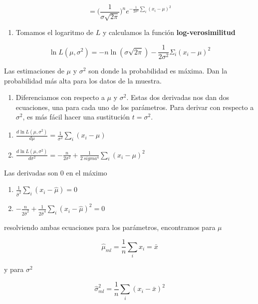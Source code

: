 \documentclass[
]{book}
\providecommand{\tightlist}{%
  \setlength{\itemsep}{0pt}\setlength{\parskip}{0pt}}
\begin{document}
\[=\big( \frac{1}{\sigma \sqrt{2 \pi}}\big)^ne^{-\frac{1}{2\sigma^2} \sum_i(x_i-\mu) ^2}\]

\begin{enumerate}
\def\labelenumi{\arabic{enumi}.}
\setcounter{enumi}{1}
\tightlist
\item
  Tomamos el logaritmo de \(L\) y calculamos la función \textbf{log-verosimilitud}
\end{enumerate}

\[\ln L(\mu, \sigma^2)=-n \ln(\sigma \sqrt{2 \pi})-\frac{1}{2\sigma^2} \Sigma_i(x_i-\mu )^2\]

Las estimaciones de \(\mu\) y \(\sigma^2\) son donde la probabilidad es máxima. Dan la probabilidad más alta para los datos de la muestra.

\begin{enumerate}
\def\labelenumi{\arabic{enumi}.}
\setcounter{enumi}{2}
\tightlist
\item
  Diferenciamos con respecto a \(\mu\) y \(\sigma^2\). Estas dos derivadas nos dan dos ecuaciones, una para cada uno de los parámetros. Para derivar con respecto a \(\sigma^2\), es más fácil hacer una sustitución \(t=\sigma^2\).
\end{enumerate}

\begin{enumerate}
\def\labelenumi{\alph{enumi})}
\item
  \(\frac{d \ln L(\mu, \sigma^2)}{d\mu}=\frac{1}{\sigma^2} \sum_i(x_i-\mu)\)
\item
  \(\frac{d \ln L(\mu, \sigma^2)}{d\sigma^2}=-\frac{n}{2 \sigma^2}+\frac{1}{2\ sigma^4} \sum_i(x_i-\mu)^2\)
\end{enumerate}

Las derivadas son \(0\) en el máximo

\begin{enumerate}
\def\labelenumi{\alph{enumi})}
\tightlist
\item
  \(\frac{1}{\hat{\sigma}^2} \sum_i(x_i-\hat{\mu})=0\)
\item
  \(-\frac{n}{2 \hat{\sigma}^2}+\frac{1}{2\hat{\sigma}^4} \sum_i(x_i-\hat{\mu})^ 2=0\)
\end{enumerate}

resolviendo ambas ecuaciones para los parámetros, encontramos para \(\mu\)

\[\hat{\mu}_{ml}=\frac{1}{n}\sum_i x_i=\bar{x}\]

y para \(\sigma^2\)

\[\hat{\sigma}^2_{ml}=\frac{1}{n}\sum_i(x_i-\bar{x})^2\]
\end{document}

